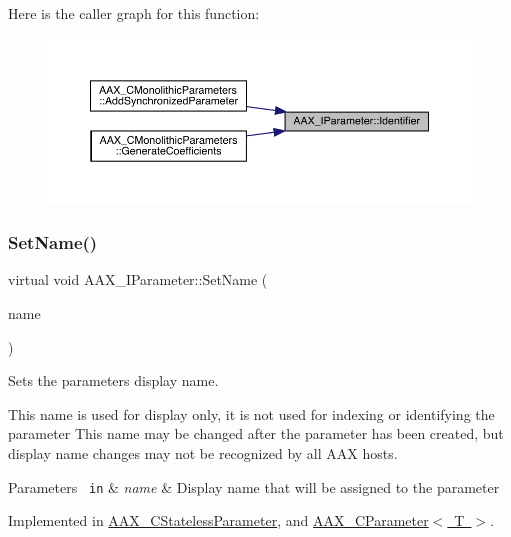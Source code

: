 Here is the caller graph for this function\+:
\nopagebreak
\begin{figure}[H]
\begin{center}
\leavevmode
\includegraphics[width=350pt]{a01857_a28807db424a720daa9880ed9ee5d4d21_icgraph}
\end{center}
\end{figure}
\mbox{\label{a01857_a480e9947cdaee6f26ca2bbaeb9de56b2}} 
\subsubsection{\texorpdfstring{SetName()}{SetName()}}
{\footnotesize\ttfamily virtual void A\+A\+X\+\_\+\+I\+Parameter\+::\+Set\+Name (\begin{DoxyParamCaption}\item[{const \mbox{\hyperlink{a01573}{A\+A\+X\+\_\+\+C\+String}} \&}]{name }\end{DoxyParamCaption})\hspace{0.3cm}{\ttfamily [pure virtual]}}



Sets the parameter\textquotesingle{}s display name. 

This name is used for display only, it is not used for indexing or identifying the parameter This name may be changed after the parameter has been created, but display name changes may not be recognized by all A\+AX hosts.


\begin{DoxyParams}[1]{Parameters}
\mbox{\texttt{ in}}  & {\em name} & Display name that will be assigned to the parameter \\
\hline
\end{DoxyParams}


Implemented in \mbox{\hyperlink{a01541_ada71762c3254475a587047b50efbead5}{A\+A\+X\+\_\+\+C\+Stateless\+Parameter}}, and \mbox{\hyperlink{a01537_a95ccc6ef9aff70e029c55caf2c2bd432}{A\+A\+X\+\_\+\+C\+Parameter$<$ T $>$}}.

